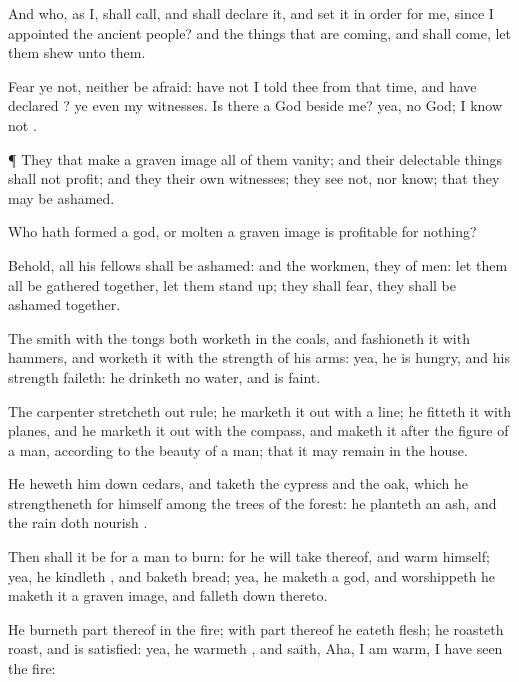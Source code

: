 {And who, as I, shall
call, and shall
declare it, and set it in
order for me, since I
appointed the
ancient
people? and the things that are
coming, and shall
come, let them
shew unto them.

Fear ye not, neither be
afraid: have not I
told thee from that
time, and have
declared
{}? ye
{} even my
witnesses. Is
there a
God
beside me? yea,
{} no
God; I
know not
{}.


\par }{\PP {}¶ They that
make a graven
image
{} all of them
vanity; and their delectable
things shall not
profit; and they
{} their own
witnesses; they
see not, nor
know; that they may be
ashamed.

Who hath
formed a
god, or
molten a graven
image
{} is
profitable for
nothing?

Behold, all his
fellows shall be
ashamed: and the
workmen, they
{} of
men: let them all be gathered
together, let them stand
up;
{} they shall
fear,
{} they shall be
ashamed
together.

The
smith with the
tongs both
worketh in the
coals, and
fashioneth it with
hammers, and
worketh it with the
strength of his
arms: yea, he is
hungry, and his
strength
faileth: he
drinketh no
water, and is
faint.

The
carpenter stretcheth
out
{}
rule; he marketh it
out with a
line; he
fitteth it with
planes, and he marketh it
out with the
compass, and
maketh it after the
figure of a
man, according to the
beauty of a
man; that it may
remain in the
house.

He heweth him
down
cedars, and
taketh the
cypress and the
oak, which he
strengtheneth for himself among the
trees of the
forest: he
planteth an
ash, and the
rain doth
nourish
{}.

Then shall it be for a
man to
burn: for he will
take thereof, and
warm himself; yea, he
kindleth
{}, and
baketh
bread; yea, he
maketh a
god, and
worshippeth
{} he
maketh it a graven
image, and falleth
down thereto.

He
burneth
part thereof
in the
fire; with
part thereof he
eateth
flesh; he
roasteth
roast, and is
satisfied: yea, he
warmeth
{}, and
saith,
Aha, I am
warm, I have
seen the
fire:

}
